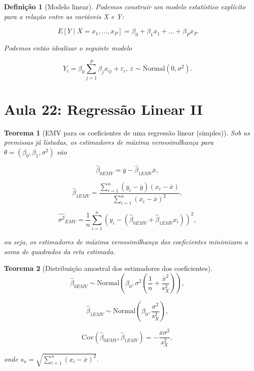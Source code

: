 \documentclass{article}
\newtheorem{theorem}{Teorema}
\newtheorem{definition}{Definição}
\begin{document}
	\begin{definition}[Modelo linear]
		Podemos construir um modelo estatístico explícito para a relação entre as variáveis X e Y:
		
		\begin{equation}
			E[Y \mid X = x_1, \ldots, x_P] = \beta_0 + \beta_1 x_1 + \ldots + \beta_P x_P
		\end{equation}
		
		Podemos então idealizar o seguinte modelo
		
		$$Y_i = \beta_0 \sum_{j = 1}^P \beta_j x_{ij} + \varepsilon_i, \ \varepsilon \sim \mathrm{Normal}(0, \sigma^2).$$
	\end{definition}
	
	\section*{Aula 22: Regressão Linear II}\label{s22}
	\begin{theorem}[EMV para os coeficientes de uma regressão linear (simples)]
		Sob as premissas já listadas, os estimadores de máxima verossimilhança para $\theta = (\beta_0, \beta_1, \sigma^2)$ são
		
		$$\hat{\beta}_{0 EMV} = \overline{y} - \hat{\beta}_{1 EMV} \overline{x},$$
		
		$$\hat{\beta}_{1 EMV} = \frac{\sum_{i = 1}^n (y_i - \overline{y})(x_i - \overline{x})}{\sum_{i = 1}^n (x_i - \overline{x})^2},$$
		
		$$\hat{\sigma^2}_{EMV} = \frac{1}{n} \sum_{i = 1}^n \left ( y_i - (\hat{\beta}_{0 EMV} + \hat{\beta}_{1 EMV} x_i) \right )^2,$$
		
		ou seja, os estimadores de máxima verossimilhança dos coeficientes minimizam a soma de quadrados da reta estimada.
	\end{theorem}
	
	\begin{theorem}[Distribuição amostral dos estimadores dos coeficientes]
		$$\hat{\beta}_{0 EMV} \sim \mathrm{Normal} \left ( \beta_0, \sigma^2 \left ( \frac{1}{n} + \frac{\overline{x}^2}{s_X^2} \right ) \right ),$$
		
		$$\hat{\beta}_{1 EMV} \sim \mathrm{Normal} \left ( \beta_0, \frac{\sigma^ 2}{s_X^2} \right ),$$
		
		$$\mathrm{Cov} (\hat{\beta}_{0 EMV}, \hat{\beta}_{1 EMV}) = - \frac{\overline{x} \sigma^2}{s_X^2},$$
		
		onde $s_x = \sqrt{\sum_{i = 1}^n (x_i - \overline{x})^2}.$
	\end{theorem}
	
\end{document}
